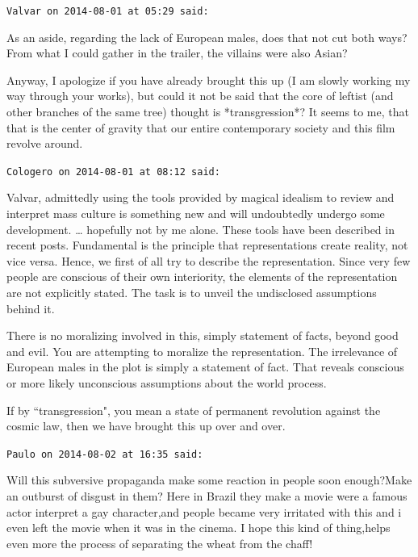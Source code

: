 \begin{footnotesize}\begin{sffamily}



\texttt{Valvar on 2014-08-01 at 05:29 said: }

As an aside, regarding the lack of European males, does that not cut both ways? From what I could gather in the trailer, the villains were also Asian?

Anyway, I apologize if you have already brought this up (I am slowly working my way through your works), but could it not be said that the core of leftist (and other branches of the same tree) thought is *transgression*? It seems to me, that that is the center of gravity that our entire contemporary society and this film revolve around.


\hfill

\texttt{Cologero on 2014-08-01 at 08:12 said: }

Valvar, admittedly using the tools provided by magical idealism to review and interpret mass culture is something new and will undoubtedly undergo some development. … hopefully not by me alone. These tools have been described in recent posts. Fundamental is the principle that representations create reality, not vice versa. Hence, we first of all try to describe the representation. Since very few people are conscious of their own interiority, the elements of the representation are not explicitly stated. The task is to unveil the undisclosed assumptions behind it.

There is no moralizing involved in this, simply statement of facts, beyond good and evil. You are attempting to moralize the representation. The irrelevance of European males in the plot is simply a statement of fact. That reveals conscious or more likely unconscious assumptions about the world process.

If by ``transgression", you mean a state of permanent revolution against the cosmic law, then we have brought this up over and over.


\hfill

\texttt{Paulo on 2014-08-02 at 16:35 said: }

Will this subversive propaganda make some reaction in people soon enough?Make an outburst of disgust in them? Here in Brazil they make a movie were a famous actor interpret a gay character,and people became very irritated with this and i even left the movie when it was in the cinema. I hope this kind of thing,helps even more the process of separating the wheat from the chaff!



\end{sffamily}
\end{footnotesize}
